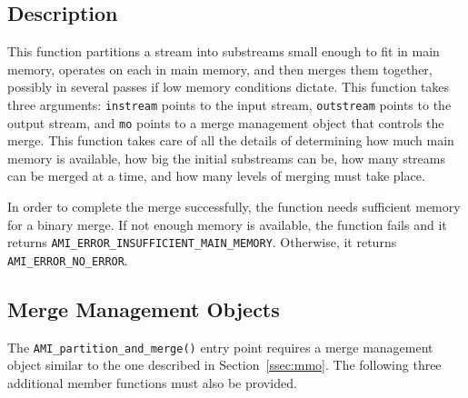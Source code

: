 \subsection{Description}
This function partitions a stream into substreams small enough to fit
in main memory, operates on each in main memory, and then merges them
together, possibly in several passes if low memory conditions dictate.
This function takes three arguments: \lstinline|instream| points to
the input stream, \lstinline|outstream| points to the output stream,
and \lstinline|mo| points to a merge management object that controls
the merge.  This function takes care of all the details of determining
how much main memory is available, how big the initial substreams can
be, how many streams can be merged at a time, and how many levels of
merging must take place.

In order to complete the merge successfully, the function needs
sufficient memory for a binary merge. If not enough memory is
available, the function fails and it returns
\lstinline|AMI_ERROR_INSUFFICIENT_MAIN_MEMORY|. Otherwise, it returns
\lstinline|AMI_ERROR_NO_ERROR|.  

\subsection{Merge Management Objects}

The \lstinline|AMI_partition_and_merge()| entry point requires a merge
management object similar to the one described in
Section~\ref{ssec:mmo}. The following three additional member
functions must also be provided.

